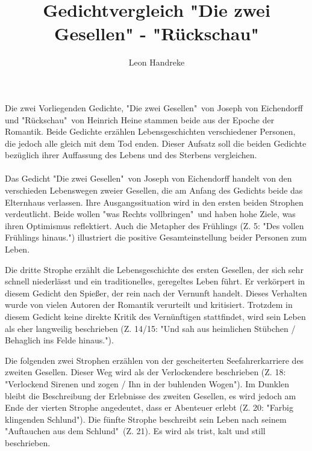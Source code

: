 \documentclass[11pt]{article}
\title{Gedichtvergleich "Die zwei Gesellen" - "Rückschau"}
\author{Leon Handreke}
\date{}                                           %
\begin{document}
\doublespacing

\maketitle

\selectfont


\paragraph{}
Die zwei Vorliegenden Gedichte, "Die zwei Gesellen"\ von Joseph von Eichendorff und "Rückschau"\ von Heinrich Heine stammen beide aus der Epoche der Romantik. Beide Gedichte erzählen Lebensgeschichten verschiedener Personen, die jedoch alle gleich mit dem Tod enden. Dieser Aufsatz soll die beiden Gedichte bezüglich ihrer Auffassung des Lebens und des Sterbens vergleichen.

\paragraph{}
Das Gedicht "Die zwei Gesellen"\ von Joseph von Eichendorff handelt von den verschieden Lebenswegen zweier Gesellen, die am Anfang des Gedichts beide das Elternhaus verlassen. Ihre Ausgangssituation wird in den ersten beiden Strophen verdeutlicht. Beide wollen "was Rechts vollbringen"\ und haben hohe Ziele, was ihren Optimismus reflektiert. Auch die Metapher des Frühlings (Z. 5: "Des vollen Frühlings hinaus.") illustriert die positive Gesamteinstellung beider Personen zum Leben.

Die dritte Strophe erzählt die Lebensgeschichte des ersten Gesellen, der sich sehr schnell niederlässt und ein traditionelles, geregeltes Leben führt. Er verkörpert in diesem Gedicht den Spießer, der rein nach der Vernunft handelt. Dieses Verhalten wurde von vielen Autoren der Romantik verurteilt und kritisiert. Trotzdem in diesem Gedicht keine direkte Kritik des Vernünftigen stattfindet, wird sein Leben als eher langweilig beschrieben (Z. 14/15: "Und sah aus heimlichen Stübchen / Behaglich ins Felde hinaus.").

Die folgenden zwei Strophen erzählen von der gescheiterten Seefahrerkarriere des zweiten Gesellen. Dieser Weg wird als der Verlockendere beschrieben (Z. 18: "Verlockend Sirenen und zogen / Ihn in der buhlenden Wogen"). Im Dunklen bleibt die Beschreibung der Erlebnisse des zweiten Gesellen, es wird jedoch am Ende der vierten Strophe angedeutet, dass er Abenteuer erlebt (Z. 20: "Farbig klingenden Schlund"). Die fünfte Strophe beschreibt sein Leben nach seinem "Auftauchen aus dem Schlund"\ (Z. 21). Es wird als trist, kalt und still beschrieben.
\end{document}

